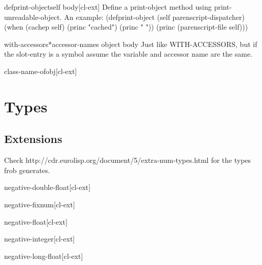 \documentclass[10pt,english]{book}
\begin{document}
\begin{macro}{defprint-object}{self \body body}[cl-ext]
  Define a print-object method using print-unreadable-object.
  An example:
  (defprint-object (self parenscript-dispatcher)
    (when (cachep self)
      (princ "cached")
      (princ " "))
    (princ (parenscript-file self)))
\end{macro}

\begin{macro}{with-accessors*}{accessor-names object \body body}
  Just like WITH-ACCESSORS, but if the slot-entry is a symbol assume
  the variable and accessor name are the same.
\end{macro}

\begin{function}{class-name-of}{obj}[cl-ext]
  
\end{function}





\chapter{Types}
\label{cha:types}

\section{Extensions}
\label{sec:extensions}

Check http://cdr.eurolisp.org/document/5/extra-num-types.html for the
types frob generates.

\begin{type}{negative-double-float}{}[cl-ext]
  
\end{type}

\begin{type}{negative-fixnum}{}[cl-ext]
  
\end{type}

\begin{type}{negative-float}{}[cl-ext]
  
\end{type}

\begin{type}{negative-integer}{}[cl-ext]
  
\end{type}

\begin{type}{negative-long-float}{}[cl-ext]
  
\end{type}
\end{document}
